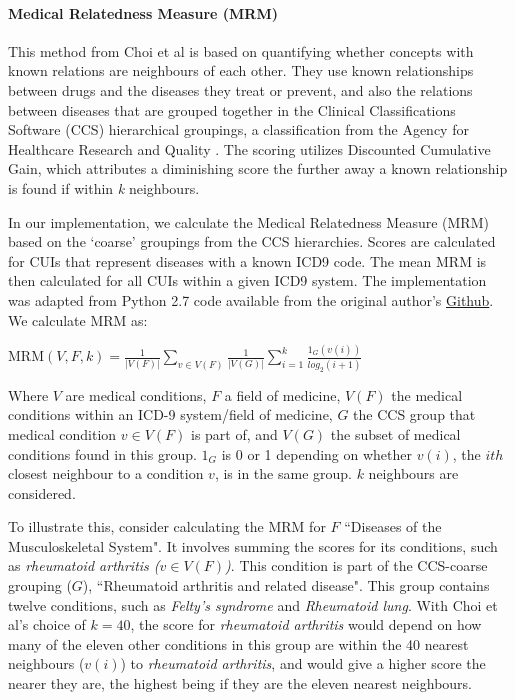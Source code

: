 \documentclass[11pt,a4paper]{article}
\begin{document}
\paragraph{Medical Relatedness Measure (MRM)}

This method from Choi et al  is based on quantifying whether concepts with known relations are neighbours of each other.  They use known relationships between drugs and the diseases they treat or prevent, and also the relations between diseases that are grouped together in the Clinical Classifications Software (CCS) hierarchical groupings, a classification from the Agency for Healthcare Research and Quality \cite{ClinicalClassificationsSoftware}. The scoring utilizes Discounted Cumulative Gain, which attributes a diminishing score the further away a known relationship is found if within \emph{k} neighbours. 

In our implementation, we calculate the Medical Relatedness Measure (MRM) based on the `coarse' groupings from the CCS hierarchies. Scores are calculated for CUIs that represent diseases with a known ICD9 code. The mean MRM is then calculated for all CUIs within a given ICD9 system. The implementation was adapted from Python 2.7 code available from the original author's \href{https://github.com/clinicalml/embeddings}{Github}. We calculate MRM as:

MRM${(V,F,k)=\frac{1}{|V(F)|}\sum\limits_{v\in V(F)}\frac{1}{|V(G)|}\sum\limits_{i=1}^k \frac{1_G(v(i))}{log_2(i+1)}}$

Where $V$ are medical conditions, $F$ a field of medicine, $V(F)$ the medical conditions within an ICD-9 system/field of medicine, $G$ the CCS group that medical condition $v\in V(F)$ is part of,  and $V(G)$ the subset of medical conditions found in this group. $1_G$ is 0 or 1 depending on whether $v(i)$, the $ith$ closest neighbour to a condition $v$, is in the same group. $k$ neighbours are considered. 

To illustrate this, consider calculating the MRM for $F$ ``Diseases of the Musculoskeletal System". It involves summing the scores for its conditions, such as \emph{rheumatoid arthritis ($v\in V(F)$)}. This condition is part of the CCS-coarse grouping ($G$), ``Rheumatoid arthritis and related disease". This group contains twelve conditions, such as \emph{Felty's syndrome} and \emph{Rheumatoid lung}. With Choi et al's choice of $k=40$, the score for \emph{rheumatoid arthritis} would depend on how many of the eleven other conditions in this group are within the 40 nearest neighbours ($v(i)$) to \emph{rheumatoid arthritis}, and would give a higher score the nearer they are, the highest being if they are the eleven nearest neighbours. 
\end{document}
